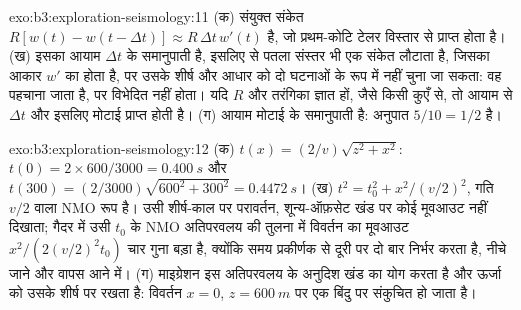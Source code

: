 \begin{solution}{exo:b3:exploration-seismology:11}
(क) संयुक्त संकेत $R[w(t) - w(t - \Delta t)] \approx R\,\Delta t\,w'(t)$ है,
जो प्रथम-कोटि टेलर विस्तार से प्राप्त होता है। (ख) इसका आयाम
$\Delta t$ के समानुपाती है, इसलिए  से पतला संस्तर भी एक संकेत लौटाता है,
जिसका आकार $w'$ का होता है, पर उसके शीर्ष और आधार को दो घटनाओं के रूप में नहीं चुना जा सकता:
वह पहचाना जाता है, पर विभेदित नहीं होता। यदि $R$ और तरंगिका ज्ञात हों, जैसे किसी कुएँ से,
तो आयाम से $\Delta t$ और इसलिए मोटाई प्राप्त होती है। (ग) आयाम मोटाई के
समानुपाती है: अनुपात $5/10 = 1/2$ है।
\end{solution}

\begin{solution}{exo:b3:exploration-seismology:12}
(क) $t(x) = (2/v)\sqrt{z^2 + x^2}$: $t(0) = 2\times600/3000 = \qty{0.400}{s}$ और
$t(300) = (2/3000)\sqrt{600^2 + 300^2} = \qty{0.4472}{s}$। (ख) $t^2 = t_0^2 +
x^2/(v/2)^2$, गति $v/2$ वाला NMO रूप है। उसी शीर्ष-काल पर परावर्तन,
शून्य-ऑफ़सेट खंड पर कोई मूवआउट नहीं दिखाता; गैदर में
उसी $t_0$ के NMO अतिपरवलय की तुलना में विवर्तन का मूवआउट
$x^2/(2(v/2)^2t_0)$ चार गुना बड़ा है, क्योंकि समय
प्रकीर्णक से दूरी पर दो बार निर्भर करता है, नीचे जाने और वापस आने में। (ग) माइग्रेशन
इस अतिपरवलय के अनुदिश खंड का योग करता है और ऊर्जा को उसके शीर्ष पर रखता है: विवर्तन
$x = 0$, $z = \qty{600}{m}$ पर एक बिंदु पर संकुचित हो जाता है।
\end{solution}


